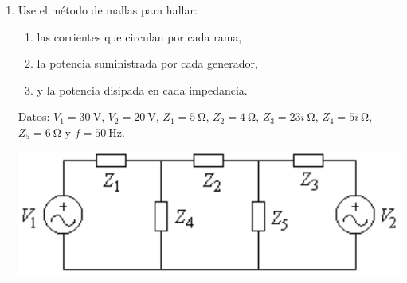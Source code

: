 \documentclass[11pt,spanish,a4paper]{article}
\begin{document}
\begin{enumerate}
	\item \begin{minipage}[t]{0.6\textwidth}
		Use el método de mallas para hallar:
		\begin{enumerate}
			\item las corrientes que circulan por cada rama,
			\item la potencia suministrada por cada generador,
			\item y la potencia disipada en cada impedancia.
		\end{enumerate}
		Datos: \(V_1= \SI{30}{\volt}\), \(V_2= \SI{20}{\volt}\), \(Z_1= \SI{5}{\ohm}\), \(Z_2= \SI{4}{\ohm}\), \(Z_3= \SI{2+3i}{\ohm}\), \(Z_4= \SI{5i}{\ohm}\), \(Z_5= \SI{6}{\ohm}\) y \(f= \SI{50}{\hertz}\).
	\end{minipage}
	\begin{minipage}[c][1em][t]{0.35\textwidth}
		\includegraphics[width=\textwidth]{p6e07}
	\end{minipage}


\end{enumerate}
\end{document}
